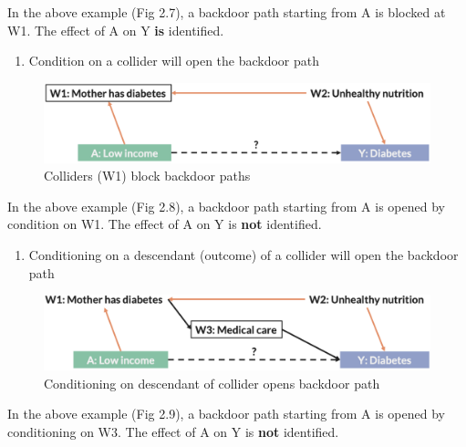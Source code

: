 \documentclass[
]{book}
\providecommand{\tightlist}{%
  \setlength{\itemsep}{0pt}\setlength{\parskip}{0pt}}
\begin{document}
In the above example (Fig 2.7), a backdoor path starting from A is blocked at W1. The effect of A on Y \textbf{is} identified.

\begin{enumerate}
\def\labelenumi{\arabic{enumi}.}
\setcounter{enumi}{4}
\tightlist
\item
  Condition on a collider will open the backdoor path
\end{enumerate}

\begin{figure}

{\centering \includegraphics[width=1\linewidth]{img/confounding/dag_rules_5} 

}

\caption{Colliders (W1) block backdoor paths}\label{fig:unnamed-chunk-19}
\end{figure}

In the above example (Fig 2.8), a backdoor path starting from A is opened by condition on W1. The effect of A on Y is \textbf{not} identified.

\begin{enumerate}
\def\labelenumi{\arabic{enumi}.}
\setcounter{enumi}{5}
\tightlist
\item
  Conditioning on a descendant (outcome) of a collider will open the backdoor path
\end{enumerate}

\begin{figure}

{\centering \includegraphics[width=1\linewidth]{img/confounding/dag_rules_6} 

}

\caption{Conditioning on descendant of collider opens backdoor path}\label{fig:unnamed-chunk-20}
\end{figure}

In the above example (Fig 2.9), a backdoor path starting from A is opened by conditioning on W3. The effect of A on Y is \textbf{not} identified.
\end{document}
